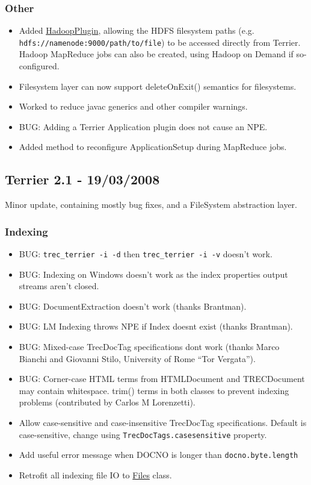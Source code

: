 \subsubsection{Other}\label{other-5}

\begin{itemize}
\tightlist
\item
  Added
  \href{javadoc/org/terrier/utility/io/HadoopPlugin.html}{HadoopPlugin},
  allowing the HDFS filesystem paths (e.g.
  \texttt{hdfs://namenode:9000/path/to/file}) to be accessed directly
  from Terrier. Hadoop MapReduce jobs can also be created, using Hadoop
  on Demand if so-configured.
\item
  Filesystem layer can now support deleteOnExit() semantics for
  filesystems.
\item
  Worked to reduce javac generics and other compiler warnings.
\item
  BUG: Adding a Terrier Application plugin does not cause an NPE.
\item
  Added method to reconfigure ApplicationSetup during MapReduce jobs.
\end{itemize}

\subsection{Terrier 2.1 - 19/03/2008}\label{terrier-2.1---19032008}

Minor update, containing mostly bug fixes, and a FileSystem abstraction
layer.

\subsubsection{Indexing}\label{indexing-6}

\begin{itemize}
\tightlist
\item
  BUG: \texttt{trec\_terrier\ -i\ -d} then
  \texttt{trec\_terrier\ -i\ -v} doesn't work.
\item
  BUG: Indexing on Windows doesn't work as the index properties output
  streams aren't closed.
\item
  BUG: DocumentExtraction doesn't work (thanks Brantman).
\item
  BUG: LM Indexing throws NPE if Index doesnt exist (thanks Brantman).
\item
  BUG: Mixed-case TrecDocTag specifications dont work (thanks Marco
  Bianchi and Giovanni Stilo, University of Rome ``Tor Vergata'').
\item
  BUG: Corner-case HTML terms from HTMLDocument and TRECDocument may
  contain whitespace. trim() terms in both classes to prevent indexing
  problems (contributed by Carlos M Lorenzetti).
\item
  Allow case-sensitive and case-insensitive TrecDocTag specifications.
  Default is case-sensitive, change using
  \texttt{TrecDocTags.casesensitive} property.
\item
  Add useful error message when DOCNO is longer than
  \texttt{docno.byte.length}
\item
  Retrofit all indexing file IO to
  \href{javadoc/org/terrier/utility/Files.html}{Files} class.
\end{itemize}


